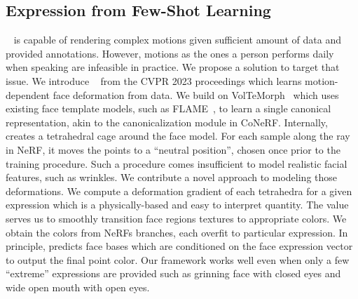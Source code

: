   \subsection{Expression from Few-Shot Learning}
    \conerf~\cite{kania2022conerf} is capable of rendering complex motions
    given sufficient amount of data and provided annotations.
    However, motions as the ones a person performs daily when speaking are
    infeasible in practice.
    We propose a solution to target that issue.
    We introduce \blendfields~\cite{kania2023blendfields} from the CVPR 2023
    proceedings which learns motion-dependent face deformation from data.
    We build on VolTeMorph~\cite{garbin2024voltemorph} which uses existing
    face template models, such as FLAME~\cite{li2017flame}, to learn a single
    canonical representation, akin to the canonicalization module in CoNeRF.
    Internally, \blendfields creates a tetrahedral cage around the face model.
    For each sample along the ray in NeRF, it moves the points to a ``neutral
    position'', chosen once prior to the training procedure.
    Such a procedure comes insufficient to model realistic facial features,
    such as wrinkles.
    We contribute a novel approach to modeling those deformations.
    We compute a deformation gradient of each tetrahedra for a given
    expression which is a physically-based and easy to interpret quantity.
    The value serves us to smoothly transition face regions textures to
    appropriate colors.
    We obtain the colors from NeRFs branches, each overfit to particular
    expression.
    In principle, \blendfields predicts face bases which are conditioned on
    the face expression vector to output the final point color.
    Our framework works well even when only a few ``extreme'' expressions are
    provided such as grinning face with closed eyes and wide open mouth with
    open eyes.

